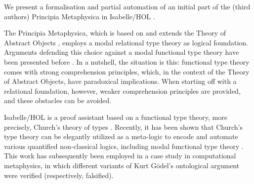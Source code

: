 %
\begin{isabellebody}%
\def\isabellecontext{TheoryOfAbstractObjectsV{\isadigit{1}}}%
%
\isadelimtheory
%
\endisadelimtheory
%
\isatagtheory
%
\endisatagtheory
{\isafoldtheory}%
%
\isadelimtheory
%
\endisadelimtheory
%
\isamarkuptrue%
%
\begin{isamarkuptext}%
We present a formalisation and partial automation of an initial part of the (third authors)
  Principia Metaphysica \cite{zalta:_princ_metap} in Isabelle/HOL \cite{Isabelle}.  

  The Principia Metaphysica, which is based on and extends the Theory of Abstract 
  Objects \cite{zalta83:_abstr_objec}, 
  employs a modal relational type theory as logical foundation. Arguments
  defending this choice against a modal functional type theory 
  have been presented before \cite{zalta11:_relat_versus_funct_found_logic}.
  In a nutshell, the situation is this: functional type theory comes with strong 
  comprehension principles, which, in the context of the Theory of Abstract Objects, 
  have paradoxical implications. When starting off with a relational foundation, however, 
  weaker comprehension principles are provided, and these obstacles can be avoided.

  Isabelle/HOL is a proof assistant based on a functional type theory, 
  more precisely, Church's theory of types \cite{Church40}. Recently, it has been shown 
  that Church's type theory can be elegantly utilized as a meta-logic to encode and 
  automate various quantified non-classical logics, including modal functional type 
  theory \cite{J23,C40}. This work has subsequently been employed in a case study in
  computational metaphysics, in which different variants of Kurt Gödel's ontological 
  argument \cite{ECAI} were verified (respectively, falsified). 
 


\end{isamarkuptext}
\end{isabellebody}
